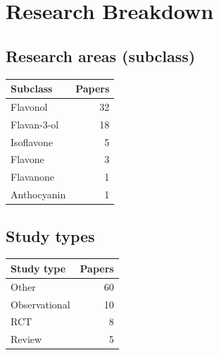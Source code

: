 \documentclass[a4paper,11pt]{article}
\begin{document}
\section*{Research Breakdown}

\noindent
\begin{minipage}[t]{0.46\linewidth}

\subsection*{Research areas (subclass)}
\begin{tabular}{lr}
\toprule
Subclass & Papers \\
\midrule
    Flavonol & 32 \\
    Flavan-3-ol & 18 \\
    Isoflavone & 5 \\
    Flavone & 3 \\
    Flavanone & 1 \\
    Anthocyanin & 1 \\
\bottomrule
\end{tabular}

\end{minipage}\hfill
\begin{minipage}[t]{0.46\linewidth}

\subsection*{Study types}
\begin{tabular}{lr}
\toprule
Study type & Papers \\
\midrule
    Other & 60 \\
    Observational & 10 \\
    RCT & 8 \\
    Review & 5 \\
\bottomrule
\end{tabular}

\end{minipage}
\end{document}

